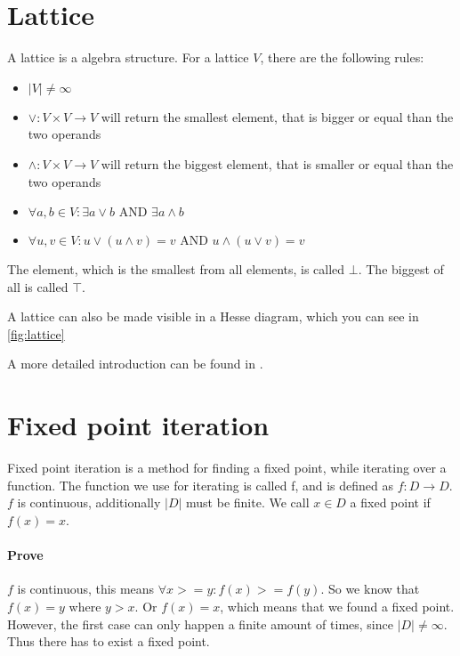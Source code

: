 \section{Lattice}
A lattice is a algebra structure. For a lattice $V$, there are the following rules:
\begin{itemize}
	\item $|V| \not= \infty $
	\item $\vee: V \times V \rightarrow V$ will return the smallest element, that is bigger or equal than the two operands
	\item $\wedge: V \times V \rightarrow V$ will return the biggest element, that is smaller or equal than the two operands
	\item $\forall a,b \in V : \exists a \vee b \text{ AND } \exists a \wedge b$
	\item $\forall u,v \in V : u \vee ( u \wedge v) = v \text{ AND } u \wedge ( u \vee v ) = v$
\end{itemize}

The element, which is the smallest from all elements, is called $\bot$. The biggest of all is called $\top$.

A lattice can also be made visible in a Hesse diagram, which you can see in \autoref{fig:lattice}

A more detailed introduction can be found in \cite{lattice_theory}.

\section{Fixed point iteration}
Fixed point iteration is a method for finding a fixed point, while iterating over a function. \newline
The function we use for iterating is called f, and is defined as $f: D \rightarrow D$. $f$ is continuous, additionally $|D|$ must be finite. We call $x \in D$ a fixed point if $f(x)=x$.

\paragraph{Prove}$f$ is continuous, this means $\forall x >= y: f(x) >= f(y)$. So we know that $f(x) = y$ where $y > x$. Or $f(x) = x$, which means that we found a fixed point. However, the first case can only happen a finite amount of times, since $|D| \not= \infty$. Thus there has to exist a fixed point.

